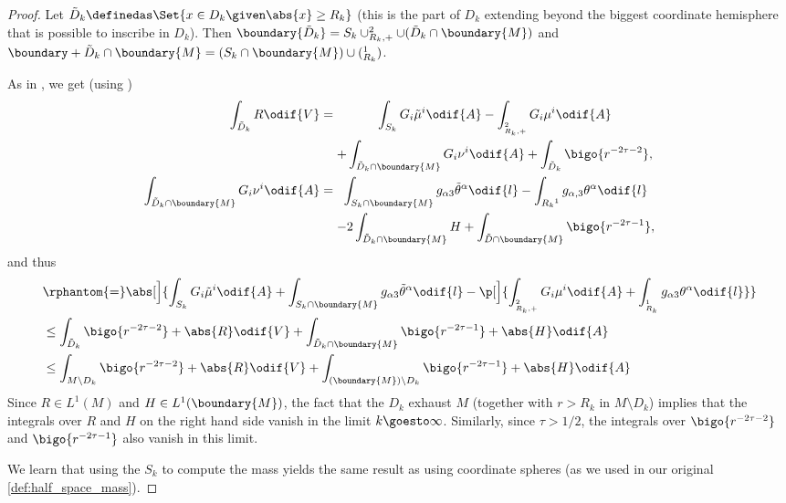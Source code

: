 \documentclass[titlepage,numbers=noenddot,headinclude,oneside,%
footinclude=true,cleardoublepage=empty,%
BCOR=5mm,paper=a4,fontsize=11pt,%
english,%
]{scrartcl}
\let\sphere\relax
\newcommand{\sphere}{\mathbb{S}}
\begin{document}
\begin{proof}
    Let \( \tilde{D}_k\definedas \Set{x\in D_k\given \abs{x}\geq R_k} \) (this is the part of \( D_k \) extending beyond the biggest coordinate hemisphere that is possible to inscribe in \( D_k \)). Then \( \boundary{\tilde{D}_k}=S_k \cup \sphere^2_{R_k,+}\cup (\tilde{D}_k\cap \boundary{M}) \) and \( \boundary+{\tilde{D}_k\cap \boundary{M}}=(S_k\cap \boundary{M})\cup (\sphere^1_{R_k}) \).



    As in \cite[Proposition 3.7]{almarazPositiveMassTheorem2016}, we get (using \cite[Equations 3.16 and 3.17]{almarazPositiveMassTheorem2016})
    \begin{align*}
        \int_{\tilde{D}_k}{R}\odif{V}&=\begin{gathered}[t]
            \int_{S_k}G_i\tilde{\mu}^i \odif{A}-\int_{\sphere^2_{R_k,+}}G_i\mu^i\odif{A}\\
            +\int_{\tilde{D}_k \cap \boundary{M}}G_i\nu^i \odif{A}+\int_{\tilde{D}_k}\bigo{r^{-2\tau-2}},
        \end{gathered}\\
        \int_{\tilde{D}_k\cap \boundary{M}}G_i \nu^i\odif{A}&=\begin{gathered}[t]
            \int_{S_k\cap \boundary{M}}g_{\alpha 3}\tilde{\theta}^\alpha\odif{l}-\int_{\sphere{R_k}^1}g_{\alpha,3}\theta^\alpha\odif{l}\\
                -2\int_{\tilde{D}_k\cap \boundary{M}}H+\int_{\tilde{D}\cap \boundary{M}}\bigo{r^{-2\tau-1}},
        \end{gathered}
    \end{align*}
    and thus
    \begin{equation*}
        \begin{aligned}[t]
        &\rphantom{=}\abs[\Big]{\int_{S_k}G_i \tilde{\mu}^i \odif{A}+\int_{S_k\cap \boundary{M}}g_{\alpha 3}\tilde{\theta}^\alpha\odif{l}-\p[\Big]{\int_{\sphere^2_{R_k,+}}G_i\mu^i \odif{A}+\int_{\sphere^1_{R_k}}g_{\alpha 3}\theta^\alpha\odif{l}}}\\
        &\leq \int_{\tilde{D}_k}\bigo{r^{-2\tau-2}}+\abs{R}\odif{V}+\int_{\tilde{D}_k\cap \boundary{M}}\bigo{r^{-2\tau-1}}+\abs{H}\odif{A}\\
        &\leq \int_{M\setminus D_k}\bigo{r^{-2\tau-2}}+\abs{R}\odif{V}+\int_{(\boundary{M})\setminus D_k}\bigo{r^{-2\tau-1}}+\abs{H}\odif{A}\\
        \end{aligned}
    \end{equation*}
    Since \( R\in L^1(M) \) and \( H\in L^1(\boundary{M}) \), the fact that the \( D_k \) exhaust \( M \) (together with \( r>R_k \) in \( M\setminus D_k \)) implies that the integrals over \( R \) and \( H \) on the right hand side vanish in the limit \( k\goesto \infty \). Similarly, since \( \tau>1/2 \), the integrals over \( \bigo{r^{-2\tau-2}} \) and \( \bigo{r^{-2\tau-1}} \) also vanish in this limit. 
     
    We learn that using the \( S_k \) to compute the mass yields the same result as using coordinate spheres (as we used in our original \cref{def:half_space_mass}).
\end{proof}
\end{document}
